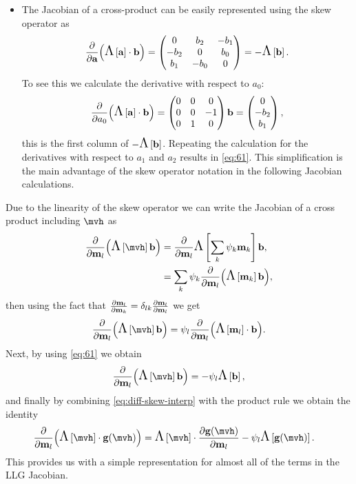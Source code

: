 {\begin{itemize}
\item The Jacobian of a cross-product can be easily represented using the skew operator as
  \begin{equation}
    \frac{\partial }{\partial {\boldsymbol{\mathrm{a}}}} {\left(  \text{\Large{$\Lambda$}}\left[ {\boldsymbol{\mathrm{a}}} \right] \cdot {\boldsymbol{\mathrm{b}}}  \right)} = \begin{pmatrix}
      0 & b_2 & -b_1 \\
      -b_2 & 0 & b_0 \\
      b_1 & -b_0 & 0
    \end{pmatrix} = -\text{\Large{$\Lambda$}}\left[ {\boldsymbol{\mathrm{b}}} \right].
    \label{eq:61}
  \end{equation}
  To see this we calculate the derivative with respect to $a_0$:
  \begin{equation}
    \frac{\partial }{\partial a_0} {\left(  \text{\Large{$\Lambda$}}\left[ {\boldsymbol{\mathrm{a}}} \right] \cdot {\boldsymbol{\mathrm{b}}}  \right)} = \begin{pmatrix}
      0 & 0 & 0 \\
      0 & 0 & -1 \\
      0 & 1 & 0
    \end{pmatrix}{\boldsymbol{\mathrm{b}}} = \begin{pmatrix} 0 \\ -b_2 \\ b_1 \end{pmatrix},
  \end{equation}
  this is the first column of $-\text{\Large{$\Lambda$}}\left[ {\boldsymbol{\mathrm{b}}} \right]$.
  Repeating the calculation for the derivatives with respect to $a_1$ and $a_2$ results in \cref{eq:61}.
  This simplification is the main advantage of the skew operator notation in the following Jacobian calculations.
\end{itemize}

Due to the linearity of the skew operator we can write the Jacobian of a cross product including $\mvh$ as
\begin{equation}
  \begin{aligned}
    \pd{}{\mv_l} \bigb{\skewm{\mvh} \bv} &= \pd{}{\mv_l} \skewm{\intp{\mv}} \bv, \\
    &= \sum_k \sbf_k \pd{}{\mv_l} \bigb{\skewm{\mv_k} \bv},
  \end{aligned}
\end{equation}
then using the fact that $\frac{\partial \boldsymbol{\mathrm{m}}_{l}}{\partial \boldsymbol{\mathrm{m}}_{k}} = \delta_{lk} \frac{\partial \boldsymbol{\mathrm{m}}_{l}}{\partial \boldsymbol{\mathrm{m}}_{l}}$ we get
\begin{equation}
  \pd{}{\mv_l} \bigb{\skewm{\mvh} \bv}  = \sbf_l \pd{}{\mv_l} \bigb{\skewm{\mv_l} \cdot \bv}.
\end{equation}
Next, by using \cref{eq:61} we obtain
\begin{equation}
  \pd{}{\mv_l} \bigb{\skewm{\mvh} \bv} = - \sbf_l\skewm{\bv},
  \label{eq:diff-skew-interp}
\end{equation}
and finally by combining \cref{eq:diff-skew-interp} with the product rule we obtain the identity
\begin{equation}
  \begin{aligned}
    \pd{}{\mv_l} \bigb{\skewm{\mvh}\cdot \gv(\mvh)}
    &= \skewm{\mvh}\cdot \pd{\gv(\mvh)}{\mv_l} - \sbf_l \skewm{\gv(\mvh)}.
    \label{eq:68}
  \end{aligned}
\end{equation}
This provides us with a simple representation for almost all of the terms in the LLG Jacobian.

}
